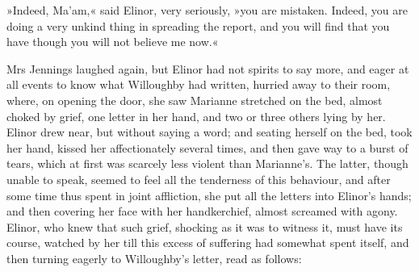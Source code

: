 »Indeed, Ma’am,« said Elinor, very seriously, »you are mistaken. Indeed, you are doing a very unkind thing in spreading the report, and you will find that you have though you will not believe me now.«

Mrs Jennings laughed again, but Elinor had not spirits to say more, and eager at all events to know what Willoughby had written, hurried away to their room, where, on opening the door, she saw Marianne stretched on the bed, almost choked by grief, one letter in her hand, and two or three others lying by her. Elinor drew near, but without saying a word; and seating herself on the bed, took her hand, kissed her affectionately several times, and then gave way to a burst of tears, which at first was scarcely less violent than Marianne’s. The latter, though unable to speak, seemed to feel all the tenderness of this behaviour, and after some time thus spent in joint affliction, she put all the letters into Elinor’s hands; and then covering her face with her handkerchief, almost screamed with agony. Elinor, who knew that such grief, shocking as it was to witness it, must have its course, watched by her till this excess of suffering had somewhat spent itself, and then turning eagerly to Willoughby’s letter, read as follows:

